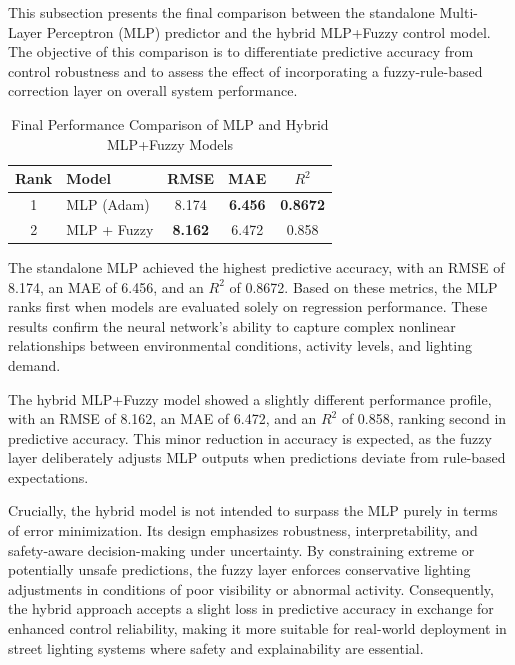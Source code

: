 \documentclass[conference]{IEEEtran}
\begin{document}
This subsection presents the final comparison between the standalone Multi-Layer Perceptron (MLP) predictor and the hybrid MLP+Fuzzy control model. The objective of this comparison is to differentiate predictive accuracy from control robustness and to assess the effect of incorporating a fuzzy-rule-based correction layer on overall system performance.

\begin{table}[H]
\centering
\caption{Final Performance Comparison of MLP and Hybrid MLP+Fuzzy Models}
\label{tab:final_comparison}
    \begin{tabular}{c|l|c|c|c}
        \hline
        \textbf{Rank} & \textbf{Model} & \textbf{RMSE} & \textbf{MAE} & \textbf{$R^2$} \\
        \hline
        1 & MLP (Adam) & 8.174 & \textbf{6.456} & \textbf{0.8672} \\
        2 & MLP + Fuzzy & \textbf{8.162} & 6.472 & 0.858 \\
        \hline
    \end{tabular}
\end{table}

The standalone MLP achieved the highest predictive accuracy, with an RMSE of 8.174, an MAE of 6.456, and an $R^2$ of 0.8672. Based on these metrics, the MLP ranks first when models are evaluated solely on regression performance. These results confirm the neural network’s ability to capture complex nonlinear relationships between environmental conditions, activity levels, and lighting demand.

The hybrid MLP+Fuzzy model showed a slightly different performance profile, with an RMSE of 8.162, an MAE of 6.472, and an $R^2$ of 0.858, ranking second in predictive accuracy. This minor reduction in accuracy is expected, as the fuzzy layer deliberately adjusts MLP outputs when predictions deviate from rule-based expectations.

Crucially, the hybrid model is not intended to surpass the MLP purely in terms of error minimization. Its design emphasizes robustness, interpretability, and safety-aware decision-making under uncertainty. By constraining extreme or potentially unsafe predictions, the fuzzy layer enforces conservative lighting adjustments in conditions of poor visibility or abnormal activity. Consequently, the hybrid approach accepts a slight loss in predictive accuracy in exchange for enhanced control reliability, making it more suitable for real-world deployment in street lighting systems where safety and explainability are essential.
\end{document}

